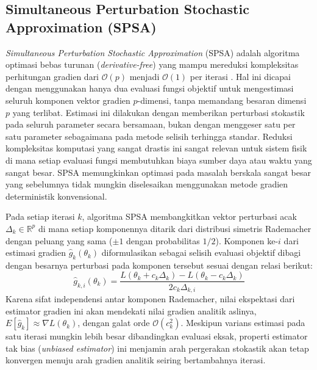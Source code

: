 \subsection{Simultaneous Perturbation Stochastic Approximation (SPSA)}
\textit{Simultaneous Perturbation Stochastic Approximation} (SPSA) adalah algoritma optimasi bebas turunan (\textit{derivative-free}) yang mampu mereduksi kompleksitas perhitungan gradien dari $\mathcal{O}(p)$ menjadi $\mathcal{O}(1)$ per iterasi \cite{spall_1992}. Hal ini dicapai dengan menggunakan hanya dua evaluasi fungsi objektif untuk mengestimasi seluruh komponen vektor gradien $p$-dimensi, tanpa memandang besaran dimensi $p$ yang terlibat. Estimasi ini dilakukan dengan memberikan perturbasi stokastik pada seluruh parameter secara bersamaan, bukan dengan menggeser satu per satu parameter sebagaimana pada metode selisih terhingga standar. Reduksi kompleksitas komputasi yang sangat drastis ini sangat relevan untuk sistem fisik di mana setiap evaluasi fungsi membutuhkan biaya sumber daya atau waktu yang sangat besar. SPSA memungkinkan optimasi pada masalah berskala sangat besar yang sebelumnya tidak mungkin diselesaikan menggunakan metode gradien deterministik konvensional.

Pada setiap iterasi $k$, algoritma SPSA membangkitkan vektor perturbasi acak $\Delta_k \in \mathbb{R}^p$ di mana setiap komponennya ditarik dari distribusi simetris Rademacher dengan peluang yang sama ($\pm 1$ dengan probabilitas $1/2$). Komponen ke-$i$ dari estimasi gradien $\hat{g}_{k}(\theta_k)$ diformulasikan sebagai selisih evaluasi objektif dibagi dengan besarnya perturbasi pada komponen tersebut sesuai dengan relasi berikut:
\begin{equation}
\hat{g}_{k,i}(\theta_k) = \frac{L(\theta_k + c_k \Delta_k) - L(\theta_k - c_k \Delta_k)}{2 c_k \Delta_{k,i}}
\end{equation}
Karena sifat independensi antar komponen Rademacher, nilai ekspektasi dari estimator gradien ini akan mendekati nilai gradien analitik aslinya, $E[\hat{g}_k] \approx \nabla L(\theta_k)$, dengan galat orde $\mathcal{O}(c_k^2)$. Meskipun varians estimasi pada satu iterasi mungkin lebih besar dibandingkan evaluasi eksak, properti estimator tak bias (\textit{unbiased estimator}) ini menjamin arah pergerakan stokastik akan tetap konvergen menuju arah gradien analitik seiring bertambahnya iterasi.

